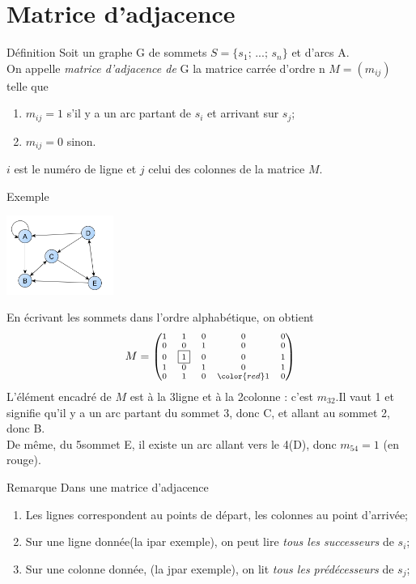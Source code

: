 \documentclass[10pt]{beamer}
\begin{document}
\section{Matrice d'adjacence}
\begin{frame}{Définition}
Soit un graphe G de sommets  $S=\{s_1;\,...;\,s_n\}$ et d'arcs A.\\\pause 
On appelle \textit{matrice d'adjacence de} G la matrice carrée d'ordre n $M=(m_{ij})$ telle que \pause
\begin{enumerate}[--]
	\item 	$m_{ij}=1$ s'il y a un arc partant de $s_i$ et arrivant sur $s_j$;\pause
	\item 	$m_{ij}=0$ sinon.\pause
\end{enumerate}
$i$ est le numéro de ligne et $j$ celui des colonnes de la matrice $M$.
\end{frame}
\begin{frame}{Exemple}
\begin{center}
\includegraphics[width=3.5cm]{img/matr_adj1.png}
\end{center}
En écrivant les sommets dans l'ordre alphabétique, on obtient\pause
$$\scriptsize M=\begin{pmatrix}
1 &1 &0 & 0&0  \\
0 & 0&1 &0 &0  \\
0 & \boxed{1} & 0 & 0 & 1\\
1 & 0 & 1 & 0 & 1\\
0 & 1 & 0 &{\color{red}1} & 0 
\end{pmatrix}$$
L'élément encadré de $M$ est à la 3\eme ligne et à la 2\eme colonne : c'est $m_{32}$.\pause Il vaut 1 et signifie qu'il y a un arc partant du sommet 3, donc C, et allant au sommet 2, donc B.\\\pause
De même, du 5\eme sommet E, il existe un arc allant vers le 4\eme (D), donc $m_{54}=1$ (en rouge).\pause
\end{frame}
\begin{frame}{Remarque}
Dans une matrice d'adjacence\pause
\begin{enumerate}[--]
	\item 	Les lignes correspondent au points de départ, les colonnes au point d'arrivée;\pause
	\item 	Sur une ligne donnée(la i\eme par exemple), on peut lire \textit{tous les successeurs} de $s_i$;\pause
	\item 	Sur une colonne donnée, (la j\eme par exemple), on lit \textit{tous les prédécesseurs} de $s_j$;
\end{enumerate}
\end{frame}
\end{document}
